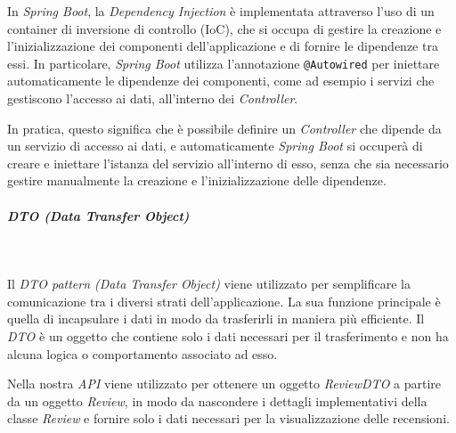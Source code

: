 \noindent In \textit{Spring Boot}, la \textit{Dependency Injection} è implementata attraverso l'uso di un container di inversione di controllo (IoC), che si occupa di gestire la creazione e l'inizializzazione dei componenti dell'applicazione e di fornire le dipendenze tra essi. In particolare, \textit{Spring Boot} utilizza l'annotazione \texttt{@Autowired} per iniettare automaticamente le dipendenze dei componenti, come ad esempio i servizi che gestiscono l'accesso ai dati, all'interno dei \textit{Controller}.

In pratica, questo significa che è possibile definire un \textit{Controller} che dipende da un servizio di accesso ai dati, e automaticamente \textit{Spring Boot} si occuperà di creare e iniettare l'istanza del servizio all'interno di esso, senza che sia necessario gestire manualmente la creazione e l'inizializzazione delle dipendenze.

\subparagraph*{DTO (Data Transfer Object)}~

Il \textit{DTO pattern (Data Transfer Object)} viene utilizzato per semplificare la comunicazione tra i diversi strati dell'applicazione. La sua funzione principale è quella di incapsulare i dati in modo da trasferirli in maniera più efficiente. Il \textit{DTO} è un oggetto che contiene solo i dati necessari per il trasferimento e non ha alcuna logica o comportamento associato ad esso.

Nella nostra \textit{API} viene utilizzato per ottenere un oggetto \textit{ReviewDTO} a partire da un oggetto \textit{Review}, in modo da nascondere i dettagli implementativi della classe \textit{Review} e fornire solo i dati necessari per la visualizzazione delle recensioni.

\pagebreak